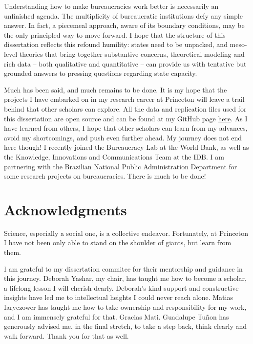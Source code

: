 \documentclass[12pt]{report}
\theoremstyle{definition}
\begin{document}
Understanding how to make bureaucracies work better is necessarily an unfinished agenda. The multiplicity of bureaucratic institutions defy any simple answer. In fact, a piecemeal approach, aware of its boundary conditions, may be the only principled way to move forward. I hope that the structure of this dissertation reflects this refound humility: states need to be unpacked, and meso-level theories that bring together substantive concerns, theoretical modeling and rich data -- both qualitative and quantitative -- can provide us with tentative but grounded answers to pressing questions regarding state capacity. 

Much has been said, and much remains to be done. It is my hope that the projects I have embarked on in my research career at Princeton will leave a trail behind that other scholars can explore. All the data and replication files used for this dissertation are open source and can be found at my GitHub page \href{https://github.com/galileukim}{here}. As I have learned from others, I hope that other scholars can learn from my advances, avoid my shortcomings, and push even further ahead. My journey does not end here though! I recently joined the Bureaucracy Lab at the World Bank, as well as the Knowledge, Innovations and Communications Team at the IDB. I am partnering with the Brazilian National Public Administration Department for some research projects on bureaucracies. There is much to be done!

\newpage

\section*{Acknowledgments}

Science, especially a social one, is a collective endeavor. Fortunately, at Princeton I have not been only able to stand on the shoulder of giants, but learn from them. 

I am grateful to my dissertation commitee for their mentorship and guidance in this journey. Deborah Yashar, my chair, has taught me how to become a scholar, a lifelong lesson I will cherish dearly. Deborah's kind support and constructive insights have led me to intellectual heights I could never reach alone. Matias Iaryczower has taught me how to take ownership and responsibility for my work, and I am immensely grateful for that. Gracias Mati. Guadalupe Tu\~{n}on has generously advised me, in the final stretch, to take a step back, think clearly and walk forward. Thank you for that as well.
\end{document}
